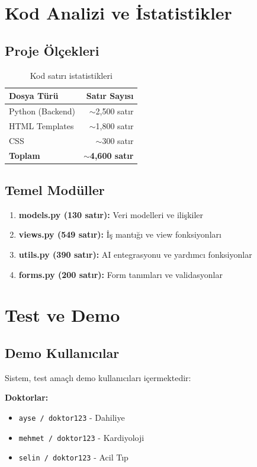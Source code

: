 \documentclass[12pt,a4paper]{article}
\begin{document}
\section{Kod Analizi ve İstatistikler}

\subsection{Proje Ölçekleri}
\begin{table}[h!]
\centering
\begin{tabular}{|l|r|}
\hline
\textbf{Dosya Türü} & \textbf{Satır Sayısı} \\
\hline
Python (Backend) & $\sim$2,500 satır \\
HTML Templates & $\sim$1,800 satır \\
CSS & $\sim$300 satır \\
\hline
\textbf{Toplam} & \textbf{$\sim$4,600 satır} \\
\hline
\end{tabular}
\caption{Kod satırı istatistikleri}
\end{table}

\subsection{Temel Modüller}
\begin{enumerate}
    \item \textbf{models.py (130 satır):} Veri modelleri ve ilişkiler
    \item \textbf{views.py (549 satır):} İş mantığı ve view fonksiyonları
    \item \textbf{utils.py (390 satır):} AI entegrasyonu ve yardımcı fonksiyonlar
    \item \textbf{forms.py (200 satır):} Form tanımları ve validasyonlar
\end{enumerate}

\section{Test ve Demo}

\subsection{Demo Kullanıcılar}
Sistem, test amaçlı demo kullanıcıları içermektedir:

\textbf{Doktorlar:}
\begin{itemize}
    \item \texttt{ayse / doktor123} - Dahiliye
    \item \texttt{mehmet / doktor123} - Kardiyoloji
    \item \texttt{selin / doktor123} - Acil Tıp
\end{itemize}
\end{document}
